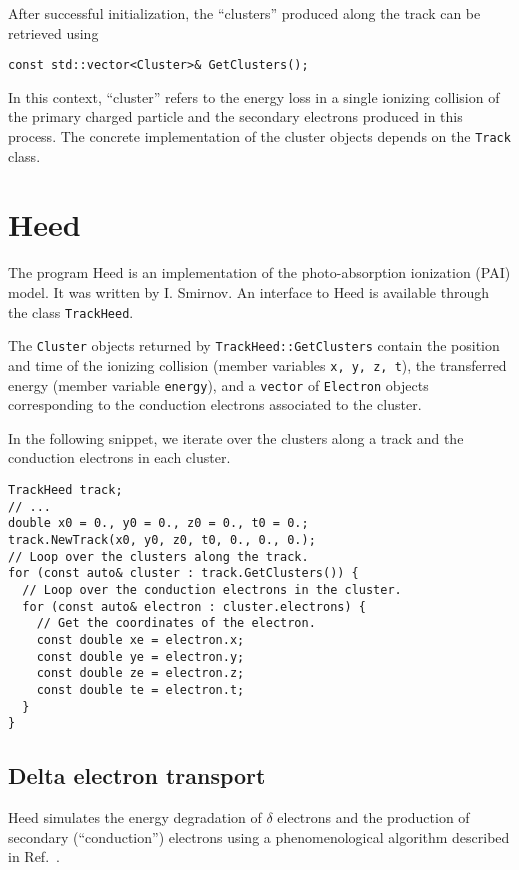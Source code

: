 After successful initialization, the ``clusters'' produced along the track
can be retrieved using
\begin{lstlisting}
const std::vector<Cluster>& GetClusters();
\end{lstlisting}
In this context, ``cluster'' refers to the energy loss in a single ionizing 
collision of the primary charged particle and the secondary 
electrons produced in this process. 
The concrete implementation of the cluster objects depends on the  
\texttt{Track} class.
  
\section{Heed}\label{Sec:Heed}

The program Heed \cite{Smirnov2005} is an implementation 
of the photo-absorption ionization (PAI) model. 
It was written by I. Smirnov.
An interface to Heed is available through the class \texttt{TrackHeed}. 

The \texttt{Cluster} objects returned by \texttt{TrackHeed::GetClusters} 
contain the position and time of the ionizing collision 
(member variables \texttt{x, y, z, t}), the transferred energy 
(member variable \texttt{energy}), and a \texttt{vector} of 
\texttt{Electron} objects corresponding to the conduction electrons 
associated to the cluster. 

In the following snippet, we iterate over the clusters along a track 
and the conduction electrons in each cluster.
\begin{lstlisting}
TrackHeed track;
// ...
double x0 = 0., y0 = 0., z0 = 0., t0 = 0.;
track.NewTrack(x0, y0, z0, t0, 0., 0., 0.);
// Loop over the clusters along the track.
for (const auto& cluster : track.GetClusters()) {
  // Loop over the conduction electrons in the cluster.
  for (const auto& electron : cluster.electrons) {
    // Get the coordinates of the electron.
    const double xe = electron.x; 
    const double ye = electron.y; 
    const double ze = electron.z; 
    const double te = electron.t; 
  }
}
\end{lstlisting}

\subsection{Delta electron transport}

Heed simulates the energy degradation of \(\delta\) electrons and 
the production of secondary (``conduction'') electrons 
using a phenomenological algorithm described in Ref.~\cite{Smirnov2005}.

